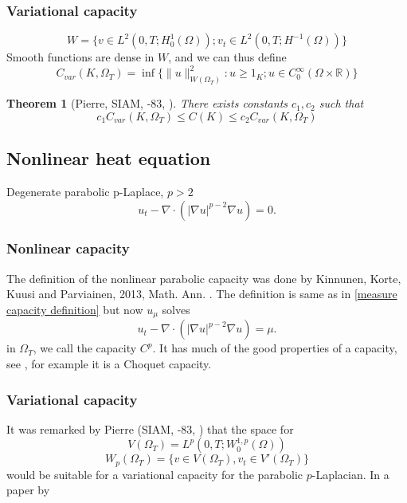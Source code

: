\documentclass[reqno,a4paper,12pt]{amsart}
\newtheorem{theorem}{Theorem}[section]
\theoremstyle{definition}
\numberwithin{theorem}{section} \numberwithin{equation}{section}
\newcommand{\R}{{\mathbb R}}
\begin{document}
\subsubsection{Variational capacity}
\begin{equation} \nonumber \label{}
	W = \{v \in L^2(0,T;H_0^1(\Omega)); v_t \in L^{2}(0,T;H^{-1}(\Omega))\}
\end{equation}
Smooth functions are dense in $W$, and we can thus define
\begin{equation} \nonumber \label{}
	C_{var}(K,\Omega_T) = \inf \{ \|u \|_{W(\Omega_T)}^2: u \geq 1_K; u \in C_0^\infty(\Omega \times \R) \}
\end{equation}
\begin{theorem}[Pierre, SIAM, -83, \cite{P}]
	There exists constants $c_1,c_2$ such that
	\begin{equation} \nonumber \label{}
		c_1 C_{var}(K,\Omega_T) \leq C(K) \leq c_2 C_{var}(K,\Omega_T)
	\end{equation}
\end{theorem}
\subsection{Nonlinear heat equation}
Degenerate parabolic p-Laplace, $p > 2$
\begin{equation} \nonumber \label{}
	u_t - \nabla \cdot (|\nabla u|^{p-2} \nabla u) = 0.
\end{equation}
\subsubsection{Nonlinear capacity}
The definition of the nonlinear parabolic capacity was done by Kinnunen, Korte, Kuusi and Parviainen, 2013, Math. Ann. \cite{KKKP}. The definition is same as in \eqref{measure capacity definition} but now $u_\mu$ solves 
\begin{equation} \nonumber \label{}
	u_t - \nabla \cdot (|\nabla u|^{p-2} \nabla u) = \mu.
\end{equation}
in $\Omega_T$, we call the capacity $C^p$.
It has much of the good properties of a capacity, see \cite{KKKP}, for example it is a Choquet capacity.
\subsubsection{Variational capacity}
It was remarked by Pierre (SIAM, -83, \cite{P}) that the space
for
\begin{equation} \nonumber \label{}
	V(\Omega_T) = L^p(0,T;W_0^{1,p}(\Omega))
\end{equation}
\begin{equation} \nonumber \label{}
	W_p(\Omega_T) = \{v \in V(\Omega_T), v_t \in V'(\Omega_T)\}
\end{equation}
would be suitable for a variational capacity for the parabolic $p$-Laplacian.
In a paper by 
\end{document}
